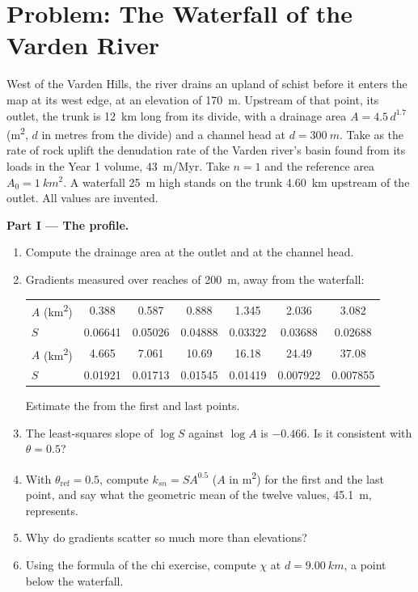 \section{Problem: The Waterfall of the Varden River}

\begin{problem}
\label{pb:b3:quantitative-geomorphology:1}
West of the Varden Hills, the river drains an upland of schist before it
enters the map at its west edge, at an elevation of \qty{170}{m}. Upstream
of that point, its outlet, the trunk is \qty{12}{km} long from its divide,
with a drainage area $A = 4.5\,d^{1.7}$ (\unit{m^2}, $d$ in metres from the
divide) and a channel head at $d = \qty{300}{m}$. Take as the rate of rock
uplift the denudation rate of the Varden river's basin found from its loads
in the Year 1 volume, \qty{43}{m/Myr}. Take $n = 1$ and the reference area $A_0 = \qty{1}{km^2}$.
A waterfall \qty{25}{m} high stands on the trunk \qty{4.60}{km} upstream of
the outlet. All values are invented.

\medskip\noindent\textbf{Part I --- The profile.}
\begin{enumerate}
\item Compute the drainage area at the outlet and at the channel head.
\item Gradients measured over reaches of \qty{200}{m}, away from the
  waterfall:

  \smallskip
  {\small\begin{tabular}{l*{6}{c}}
  $A$ (\unit{km^2}) & 0.388 & 0.587 & 0.888 & 1.345 & 2.036 & 3.082 \\
  $S$ & 0.06641 & 0.05026 & 0.04888 & 0.03322 & 0.03688 & 0.02688 \\[2pt]
  $A$ (\unit{km^2}) & 4.665 & 7.061 & 10.69 & 16.18 & 24.49 & 37.08 \\
  $S$ & 0.01921 & 0.01713 & 0.01545 & 0.01419 & 0.007922 & 0.007855
  \end{tabular}}

  \smallskip
  Estimate the  from the first and last points.
\item The least-squares slope of $\log S$ against $\log A$ is $-0.466$.
  Is it consistent with $\theta = 0.5$?
\item With $\theta_{\mathrm{ref}} = 0.5$, compute $k_{sn} = S A^{0.5}$ ($A$ in
  \unit{m^2}) for the first and the last point, and say what the geometric
  mean of the twelve values, \qty{45.1}{m}, represents.
\item Why do gradients scatter so much more than elevations?
\item Using the formula of the chi exercise, compute $\chi$ at $d =
  \qty{9.00}{km}$, a point below the waterfall.
\end{enumerate}


\end{problem}
